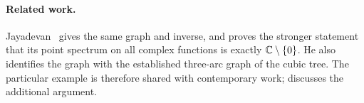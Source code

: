 
\paragraph{Related work.}
Jayadevan~\cite{jayadevan-15-89} gives the same graph and inverse,
and proves the stronger statement that its point spectrum on all
complex functions is exactly \(\mathbb C\setminus\{0\}\). He also identifies
the graph with the established three-arc graph of the cubic tree.
The particular example is therefore shared with contemporary work;
\comparisonlocation{} discusses the additional argument.
